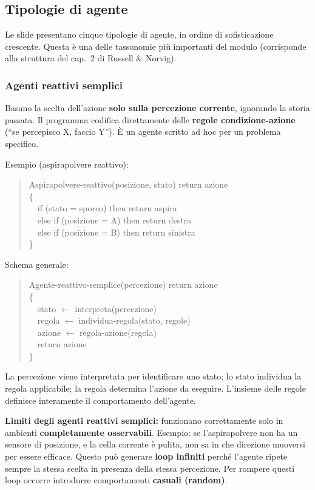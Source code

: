 \documentclass[11pt,a4paper]{report}
\begin{document}
\subsection{Tipologie di agente}

Le slide presentano cinque tipologie di agente, in ordine di sofisticazione crescente. Questa è una delle tassonomie più importanti del modulo (corrisponde alla struttura del cap.\ 2 di Russell \& Norvig).

\subsubsection*{Agenti reattivi semplici}

Basano la scelta dell'azione \textbf{solo sulla percezione corrente}, ignorando la storia passata. Il programma codifica direttamente delle \textbf{regole condizione-azione} (``se percepisco X, faccio Y''). È un agente scritto ad hoc per un problema specifico.

Esempio (aspirapolvere reattivo):
\begin{quote}
\ttfamily
Aspirapolvere-reattivo(posizione, stato) return azione\\
\{\\
\ \ if (stato = sporco) then return aspira\\
\ \ else if (posizione = A) then return destra\\
\ \ else if (posizione = B) then return sinistra\\
\}
\end{quote}

Schema generale:
\begin{quote}
\ttfamily
Agente-reattivo-semplice(percezione) return azione\\
\{\\
\ \ stato $\leftarrow$ interpreta(percezione)\\
\ \ regola $\leftarrow$ individua-regola(stato, regole)\\
\ \ azione $\leftarrow$ regola-azione(regola)\\
\ \ return azione\\
\}
\end{quote}

La percezione viene interpretata per identificare uno stato; lo stato individua la regola applicabile; la regola determina l'azione da eseguire. L'insieme delle regole definisce interamente il comportamento dell'agente.

\textbf{Limiti degli agenti reattivi semplici:} funzionano correttamente solo in ambienti \textbf{completamente osservabili}. Esempio: se l'aspirapolvere non ha un sensore di posizione, e la cella corrente è pulita, non sa in che direzione muoversi per essere efficace. Questo può generare \textbf{loop infiniti} perché l'agente ripete sempre la stessa scelta in presenza della stessa percezione. Per rompere questi loop occorre introdurre comportamenti \textbf{casuali (random)}.
\end{document}
